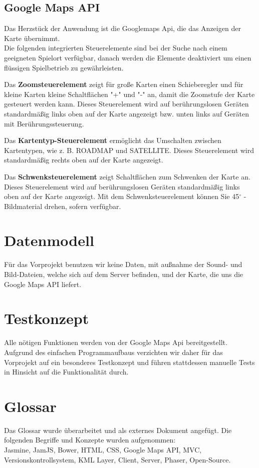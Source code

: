\documentclass[11pt,a4paper]{article}
\begin{document}
\subsection{Google Maps API}

Das Herzstück der Anwendung ist die Googlemaps Api, die das Anzeigen der Karte  übernimmt.\\
Die folgenden integrierten Steuerelemente sind bei der Suche nach einem geeigneten Spielort verfügbar, danach werden die Elemente deaktiviert um einen flüssigen Spielbetrieb zu gewährleisten. \par\bigskip
Das \textbf{Zoomsteuerelement} zeigt für große Karten einen Schieberegler und für kleine Karten kleine Schaltflächen "+" und "-" an, damit die Zoomstufe der Karte gesteuert werden kann. Dieses Steuerelement wird auf berührungslosen Geräten standardmäßig links oben auf der Karte angezeigt bzw. unten links auf Geräten mit Berührungssteuerung.\par\bigskip
Das \textbf{Kartentyp-Steuerelement} ermöglicht das Umschalten zwischen Kartentypen, wie z. B. ROADMAP und SATELLITE. Dieses Steuerelement wird standardmäßig rechts oben auf der Karte angezeigt.\par\bigskip
Das \textbf{Schwenksteuerelement} zeigt Schaltflächen zum Schwenken der Karte an. Dieses Steuerelement wird auf berührungslosen Geräten standardmäßig links oben auf der Karte  angezeigt. Mit dem Schwenksteuerelement können Sie 45$^\circ$ -Bildmaterial drehen, sofern verfügbar.


\section{Datenmodell}
Für das Vorprojekt benutzen wir keine Daten, mit außnahme der Sound- und Bild-Dateien, welche sich auf dem Server befinden, und der Karte, die uns die Google Maps API liefert.

\section{Testkonzept}
Alle nötigen Funktionen werden von der Google Maps Api bereitgestellt.
Aufgrund des einfachen Programmaufbaus verzichten wir daher für das Vorprojekt auf ein besonderes Testkonzept und führen stattdessen manuelle Tests in Hinsicht auf die Funktionalität durch.
\section{Glossar}
Das Glossar wurde überarbeitet und als externes Dokument angefügt.
Die folgenden Begriffe und Konzepte wurden aufgenommen: \\
Jasmine, JamJS, Bower, HTML, CSS, Google Maps API, MVC, Versionskontrollsystem, KML Layer, Client, Server, Phaser, Open-Source.
\end{document}
